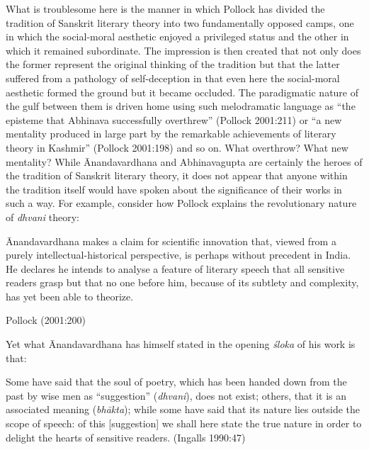 What is troublesome here is the manner in which Pollock has divided the tradition of Sanskrit literary theory into two fundamentally opposed camps, one in which the social-moral aesthetic enjoyed a privileged status and the other in which it remained subordinate. The impression is then created that not only does the former represent the original thinking of the tradition but that the latter suffered from a pathology of self-deception in that even here the social-moral aesthetic formed the ground but it became occluded. The paradigmatic nature of the gulf between them is driven home using such melodramatic language as ``the episteme that Abhinava successfully overthrew'' (Pollock 2001:211) or ``a new mentality produced in large part by the remarkable achievements of literary theory in Kashmir'' (Pollock 2001:198) and so on. What overthrow? What new mentality? While Ānandavardhana and Abhinavagupta are certainly the heroes of the tradition of Sanskrit literary theory, it does not appear that anyone within the tradition itself would have spoken about the significance of their works in such a way. For example, consider how Pollock explains the revolutionary nature of {\sl dhvani} theory:  

\begin{myquote}
Ānandavardhana makes a claim for scientific innovation that, viewed from a purely intellectual-historical perspective, is perhaps without precedent in India. He declares he intends to analyse a feature of literary speech that all sensitive readers grasp but that no one before him, because of its subtlety and complexity, has yet been able to theorize. 

\hfill Pollock (2001:200)
\end{myquote}

Yet what Ānandavardhana has himself stated in the opening {\sl śloka} of his work is that:

\begin{myquote}
Some have said that the soul of poetry, which has been handed down from the past by wise men as ``suggestion'' ({\sl dhvani}), does not exist; others, that it is an associated meaning ({\sl bhākta}); while some have said that its nature lies outside the scope of speech: of this [suggestion] we shall here state the true nature in order to delight the hearts of sensitive readers. 
\hfill (Ingalls 1990:47)
\end{myquote}

